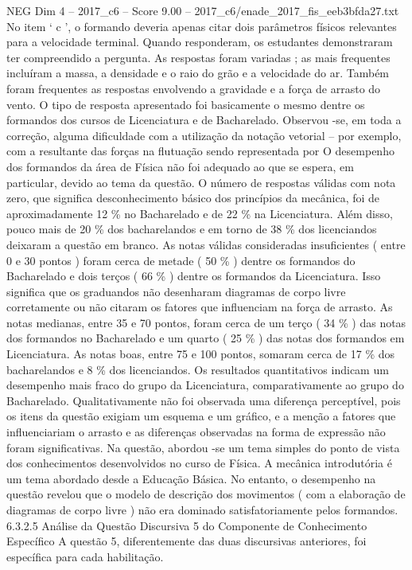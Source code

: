 \begin{textsample}{NEG Dim 4 – 2017\_c6 – Score 9.00 – 2017\_c6/enade\_2017\_fis\_eeb3bfda27.txt}
No item ‘ c ’, o formando deveria apenas citar dois parâmetros físicos relevantes para a velocidade terminal.
Quando responderam, os estudantes demonstraram ter compreendido a pergunta.
As respostas foram variadas ; as mais frequentes incluíram a massa, a densidade e o raio do grão e a velocidade do ar.
Também foram frequentes as respostas envolvendo a gravidade e a força de arrasto do vento.
O tipo de resposta apresentado foi basicamente o mesmo dentre os formandos dos cursos de Licenciatura e de Bacharelado.
Observou -se, em toda a correção, alguma dificuldade com a utilização da notação vetorial – por exemplo, com a resultante das forças na flutuação sendo representada por O desempenho dos formandos da área de Física não foi adequado ao que se espera, em particular, devido ao tema da questão.
O número de respostas válidas com nota zero, que significa desconhecimento básico dos princípios da mecânica, foi de aproximadamente 12 \% no Bacharelado e de 22 \% na Licenciatura.
Além disso, pouco mais de 20 \% dos bacharelandos e em torno de 38 \% dos licenciandos deixaram a questão em branco.
As notas válidas consideradas insuficientes ( entre 0 e 30 pontos ) foram cerca de metade ( 50 \% ) dentre os formandos do Bacharelado e dois terços ( 66 \% ) dentre os formandos da Licenciatura.
Isso significa que os graduandos não desenharam diagramas de corpo livre corretamente ou não citaram os fatores que influenciam na força de arrasto.
As notas medianas, entre 35 e 70 pontos, foram cerca de um terço ( 34 \% ) das notas dos formandos no Bacharelado e um quarto ( 25 \% ) das notas dos formandos em Licenciatura.
As notas boas, entre 75 e 100 pontos, somaram cerca de 17 \% dos bacharelandos e 8 \% dos licenciandos.
Os resultados quantitativos indicam um desempenho mais fraco do grupo da Licenciatura, comparativamente ao grupo do Bacharelado.
Qualitativamente não foi observada uma diferença perceptível, pois os itens da questão exigiam um esquema e um gráfico, e a menção a fatores que influenciariam o arrasto e as diferenças observadas na forma de expressão não foram significativas.
Na questão, abordou -se um tema simples do ponto de vista dos conhecimentos desenvolvidos no curso de Física.
A mecânica introdutória é um tema abordado desde a Educação Básica.
No entanto, o desempenho na questão revelou que o modelo de descrição dos movimentos ( com a elaboração de diagramas de corpo livre ) não era dominado satisfatoriamente pelos formandos. 6.3.2.5 Análise da Questão Discursiva 5 do Componente de Conhecimento Específico A questão 5, diferentemente das duas discursivas anteriores, foi específica para cada habilitação.

\end{textsample}
